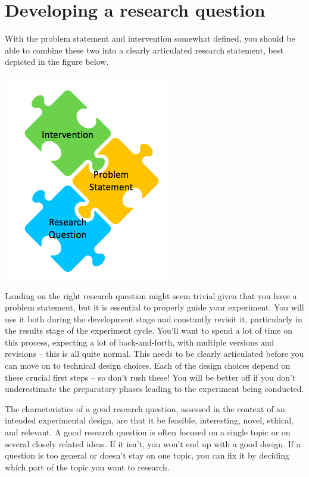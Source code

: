 \documentclass[openany]{book}
\begin{document}
\hypertarget{developing-a-research-question}{%
\chapter{Developing a research question}\label{developing-a-research-question}}

With the problem statement and intervention somewhat defined, you should be able to combine these two into a clearly articulated research statement, best depicted in the figure below.

\includegraphics{fig/research-question.png}

Landing on the right research question might seem trivial given that you have a problem statement, but it is essential to properly guide your experiment. You will use it both during the development stage and constantly revisit it, particularly in the results stage of the experiment cycle.
You'll want to spend a lot of time on this process, expecting a lot of back-and-forth, with multiple versions and revisions -- this is all quite normal. This needs to be clearly articulated before you can move on to technical design choices.
Each of the design choices depend on these crucial first steps -- so don't rush these! You will be better off if you don't underestimate the preparatory phases leading to the experiment being conducted.

The characteristics of a good research question, assessed in the context of an intended experimental design, are that it be feasible, interesting, novel, ethical, and relevant. A good research question is often focused on a single topic or on several closely related ideas. If it isn't, you won't end up with a good design. If a question is too general or doesn't stay on one topic, you can fix it by deciding which part of the topic you want to research.
\end{document}
